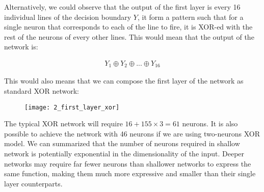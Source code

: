 \hfill\break
Alternatively, we could observe that the output of the first layer is every 16 individual lines of the decision boundary $Y$, it form a pattern such that for a single neuron that corresponds to each of the line to fire, it is XOR-ed with the rest of the neurons of every other lines. This would mean that the output of the network is:

\begin{align}
	Y_1 \oplus Y_2 \oplus ... \oplus Y_{16}
\end{align}

\hfill\break
This would also means that we can compose the first layer of the network as standard XOR network:

 \begin{figure}[H]
	\centering
	\texttt{[image: 2\_first\_layer\_xor]}
\end{figure}

\hfill\break
The typical XOR network will require $16 + 155\times 3 = 61$ neurons. It is also possible to achieve the network with 46 neurons if we are using two-neurons XOR model. We can summarized that the number of neurons required in shallow network is potentially exponential in the dimensionality of the input. Deeper networks may require far fewer neurons than shallower networks to express the same function, making them much more expressive and smaller than their single layer counterparts.




























